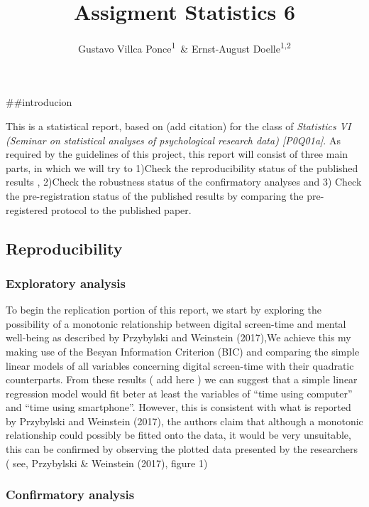 \documentclass[man]{apa6}
\title{Assigment Statistics 6}
\author{Gustavo Villca Ponce\textsuperscript{1}~\& Ernst-August Doelle\textsuperscript{1,2}}
\affiliation{
    \vspace{0.5cm}
          \textsuperscript{1} Wilhelm-Wundt-University\\
          \textsuperscript{2} Konstanz Business School  }
\theoremstyle{definition}
\theoremstyle{definition}
\theoremstyle{definition}
\theoremstyle{remark}
\begin{document}
\maketitle

\setcounter{secnumdepth}{0}



\#\#introducion

This is a statistical report, based on (add citation) for the class of
\emph{Statistics VI (Seminar on statistical analyses of psychological
research data) {[}P0Q01a{]}}. As required by the guidelines of this
project, this report will consist of three main parts, in which we will
try to 1)Check the reproducibility status of the published results ,
2)Check the robustness status of the confirmatory analyses and 3) Check
the pre-registration status of the published results by comparing the
pre-registered protocol to the published paper.

\hypertarget{reproducibility}{%
\subsection{Reproducibility}\label{reproducibility}}

\hypertarget{exploratory-analysis}{%
\subsubsection{Exploratory analysis}\label{exploratory-analysis}}

To begin the replication portion of this report, we start by exploring
the possibility of a monotonic relationship between digital screen-time
and mental well-being as described by Przybylski and Weinstein (2017),We
achieve this my making use of the Besyan Information Criterion (BIC) and
comparing the simple linear models of all variables concerning digital
screen-time with their quadratic counterparts. From these results ( add
here ) we can suggest that a simple linear regression model would fit
beter at least the variables of \enquote{time using computer} and
\enquote{time using smartphone}. However, this is consistent with what
is reported by Przybylski and Weinstein (2017), the authors claim that
although a monotonic relationship could possibly be fitted onto the
data, it would be very unsuitable, this can be confirmed by observing
the plotted data presented by the researchers ( see, Przybylski \&
Weinstein (2017), figure 1)

\hypertarget{confirmatory-analysis}{%
\subsubsection{Confirmatory analysis}\label{confirmatory-analysis}}
\end{document}
